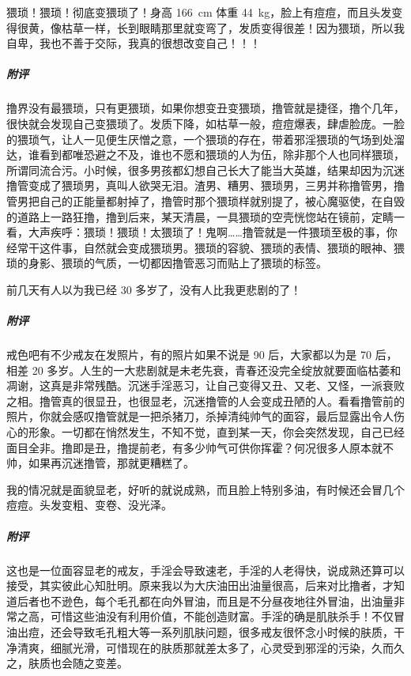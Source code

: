 \begin{case}[变丑]
    猥琐！猥琐！彻底变猥琐了！身高 \SI{166}{\centi\metre} 体重 \SI{44}{\kilo\gram}，脸上有痘痘，而且头发变得很黄，像枯草一样，长到眼睛那里就变弯了，发质变得很差！因为猥琐，所以我自卑，我也不善于交际，我真的很想改变自己！！！
    \subparagraph{附评} 撸界没有最猥琐，只有更猥琐，如果你想变丑变猥琐，撸管就是捷径，撸个几年，很快就会发现自己变猥琐了。发质下降，如枯草一般，痘痘爆表，肆虐脸庞。一脸的猥琐气，让人一见便生厌憎之意，一个猥琐的存在，带着邪淫猥琐的气场到处溜达，谁看到都唯恐避之不及，谁也不愿和猥琐的人为伍，除非那个人也同样猥琐，所谓同流合污。小时候，很多男孩都幻想自己长大了能当大英雄，结果却因为沉迷撸管变成了猥琐男，真叫人欲哭无泪。渣男、糟男、猥琐男，三男并称撸管男，撸管男把自己的正能量都射掉了，撸管时那个猥琐样就别提了，被心魔驱使，在自毁的道路上一路狂撸，撸到后来，某天清晨，一具猥琐的空壳恍惚站在镜前，定睛一看，大声疾呼：猥琐！猥琐！太猥琐了！鬼啊……撸管就是一件猥琐至极的事，你经常干这件事，自然就会变成猥琐男。猥琐的容貌、猥琐的表情、猥琐的眼神、猥琐的身影、猥琐的气质，一切都因撸管恶习而贴上了猥琐的标签。
\end{case}

\begin{case}[变丑]
    前几天有人以为我已经 30 多岁了，没有人比我更悲剧的了！
    \subparagraph{附评} 戒色吧有不少戒友在发照片，有的照片如果不说是 90 后，大家都以为是 70 后，相差 20 多岁。人生的一大悲剧就是未老先衰，青春还没完全绽放就要面临枯萎和凋谢，这真是非常残酷。沉迷手淫恶习，让自己变得又丑、又老、又怪，一派衰败之相。撸管真的很显丑，也很显老，沉迷撸管的人会变成丑陋的人。看看撸管前的照片，你就会感叹撸管就是一把杀猪刀，杀掉清纯帅气的面容，最后显露出令人伤心的形象。一切都在悄然发生，不知不觉，直到某一天，你会突然发现，自己已经面目全非。撸即是丑，撸提前老，有多少帅气可供你挥霍？何况很多人原本就不帅，如果再沉迷撸管，那就更糟糕了。
\end{case}

\begin{case}[变丑]
    我的情况就是面貌显老，好听的就说成熟，而且脸上特别多油，有时候还会冒几个痘痘。头发变粗、变卷、没光泽。
    \subparagraph{附评} 这也是一位面容显老的戒友，手淫会导致速老，手淫的人老得快，说成熟还算可以接受，其实彼此心知肚明。原来我以为大庆油田出油量很高，后来对比撸者，才知道后者也不逊色，每个毛孔都在向外冒油，而且是不分昼夜地往外冒油，出油量非常之高，可惜这些油没有利用价值，不能创造财富。手淫的确是肌肤杀手！不仅冒油出痘，还会导致毛孔粗大等一系列肌肤问题，很多戒友很怀念小时候的肤质，干净清爽，细腻光滑，可惜现在的肤质那就差太多了，心灵受到邪淫的污染，久而久之，肤质也会随之变差。
\end{case}

